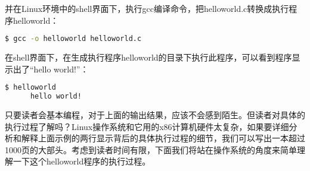 并在Linux环境中的shell界面下，执行gcc编译命令，把helloworld.c转换成执行程序helloworld：

\begin{lstlisting}[language={bash}]
$ gcc -o helloworld helloworld.c
\end{lstlisting}

在shell界面下，在生成执行程序helloworld的目录下执行此程序，可以看到程序显示出了“hello world!”：
\begin{lstlisting}[language={bash}]
	  $ helloworld
	  hello world!
\end{lstlisting}


只要读者会基本编程，对于上面的输出结果，应该不会感到陌生。但读者对具体的执行过程了解吗？Linux操作系统和它用的x86计算机硬件太复杂，如果要详细分析和解释上面示例的两行显示背后的具体执行过程的细节，我们可以写出一本超过1000页的大部头。考虑到读者时间有限，下面我们将站在操作系统的角度来简单理解一下这个helloworld程序的执行过程。



